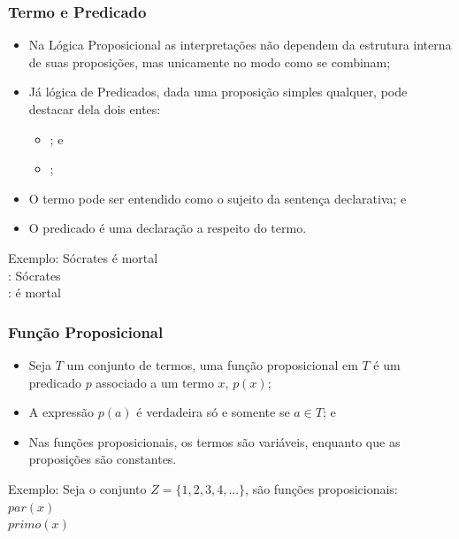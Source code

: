 \documentclass{beamer}
\begin{document}
\begin{frame}
\frametitle{Termo e Predicado}

\begin{itemize}
	\item Na Lógica Proposicional as interpretações não dependem da estrutura interna de suas proposições, mas unicamente no modo como se combinam;
	\item Já lógica de Predicados, dada uma proposição simples qualquer, pode destacar dela dois entes:
	\begin{itemize}
		\item {}; e
		\item {};
	\end{itemize}
	\item O termo pode ser entendido como o sujeito da sentença declarativa; e
	\item O predicado é uma declaração a respeito do termo.
\end{itemize}\vfill

\begin{exampleblock}{Exemplo:}
Sócrates é mortal\\
: Sócrates\\
: é mortal
\end{exampleblock}
\end{frame}

\begin{frame}
\frametitle{Função Proposicional}

\begin{itemize}
	\item Seja $T$ um conjunto de termos, uma função proposicional em $T$ é um predicado $p$ associado a um termo $x$, $p(x)$;
	\item A expressão $p(a)$ é verdadeira só e somente se $a \in T$; e
	\item Nas funções proposicionais, os termos são variáveis, enquanto que as proposições são constantes.
\end{itemize}\vfill

\begin{exampleblock}{Exemplo:}
Seja o conjunto $Z = \{1, 2, 3, 4, . . .\}$, são funções proposicionais:\\
$par(x)$\\
$primo(x)$
\end{exampleblock}
\end{frame}
\end{document}

